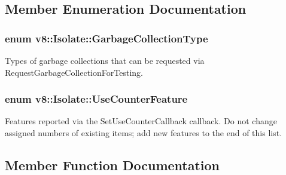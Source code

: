 \subsection{Member Enumeration Documentation}
\subsubsection[{\texorpdfstring{Garbage\+Collection\+Type}{GarbageCollectionType}}]{\setlength{\rightskip}{0pt plus 5cm}enum {\bf v8\+::\+Isolate\+::\+Garbage\+Collection\+Type}}\hypertarget{classv8_1_1Isolate_a5ae00cc99d8aca148c6f5f9698c432c9}{}\label{classv8_1_1Isolate_a5ae00cc99d8aca148c6f5f9698c432c9}
Types of garbage collections that can be requested via Request\+Garbage\+Collection\+For\+Testing. 
\subsubsection[{\texorpdfstring{Use\+Counter\+Feature}{UseCounterFeature}}]{\setlength{\rightskip}{0pt plus 5cm}enum {\bf v8\+::\+Isolate\+::\+Use\+Counter\+Feature}}\hypertarget{classv8_1_1Isolate_aed6909379c3f2820cb3084710b73385d}{}\label{classv8_1_1Isolate_aed6909379c3f2820cb3084710b73385d}
Features reported via the Set\+Use\+Counter\+Callback callback. Do not change assigned numbers of existing items; add new features to the end of this list. 

\subsection{Member Function Documentation}
